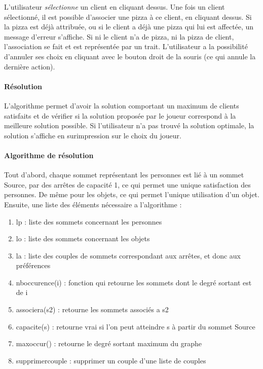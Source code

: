 		L'utilisateur \emph{sélectionne} un client en cliquant dessus.
		    Une fois un client sélectionné, il est possible
		    d'associer une pizza à ce client, en cliquant dessus.
		    Si la pizza est déjà attribuée, ou si le client a déjà
		    une pizza qui lui est affectée, un message d'erreur s'affiche.
		    Si ni le client n'a de pizza, ni la pizza de client, l'association
		    se fait et est représentée par un trait.
		L'utilisateur a la possibilité d'annuler ses choix en cliquant avec le bouton
		    droit de la souris (ce qui annule la dernière action).
		\paragraph{Résolution}
			L'algorithme permet d'avoir la solution comportant un maximum de clients
			 satisfaits et de vérifier si la solution proposée par le joueur correspond
			 à la meilleure solution possible.
 			Si l'utilisateur n'a pas trouvé la solution optimale, la solution s'affiche
			 en surimpression sur le choix du joueur.

		\paragraph{Algorithme de résolution}
			Tout d'abord, chaque sommet représentant les personnes est lié à un sommet
			 Source, par des arrêtes de capacité 1, ce qui permet une unique satisfaction
			 des personnes.
			De même pour les objets, ce qui permet l'unique utilisation d'un objet.
			Ensuite, une liste des éléments nécessaire a l'algorithme :
		        \begin{enumerate}
		        	\item lp : liste des sommets concernant les personnes
		        	\item lo : liste des sommets concernant les objets
				\item la : liste des couples de sommets correspondant aux arrêtes, et donc aux préférences
				\item nboccurence(i) : fonction qui retourne les sommets dont le degré sortant est de i
				\item associera(s2) : retourne les sommets associés a s2
				\item capacite(s) : retourne vrai si l'on peut atteindre s à partir du sommet Source
				\item maxoccur() : retourne le degré sortant maximum du graphe
				\item supprimercouple : supprimer un couple d'une liste de couples
            		\end{enumerate}

